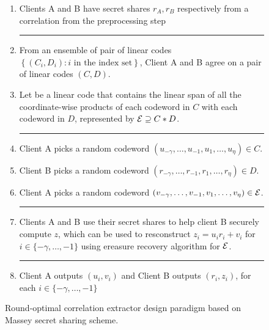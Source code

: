 \begin{figure}[htp]%
\begin{boxedalgo}
\begin{enumerate}[leftmargin=5mm]
	\item Clients A and B have secret shares $r_A, r_B $ respectively from a correlation from the preprocessing step\\
	\hrule
	
	\item From an ensemble of pair of linear codes $\left\{(C_i,D_i)\colon i\text{ in the index set}\right\}$, Client A and B agree on a pair of linear codes $(C,D)$.
	
	\item Let \cE be a linear code that contains the linear span of all the coordinate-wise products of each codeword in $C$ with each codeword in $D$, represented by ${\mathcal E} \supseteq C*D$. \\
	\hrule
	
	\item Client A picks a random codeword $(u_{-\gamma},\dotsc,u_{-1},u_1,\dotsc,u_\eta)\in C$.
	
	\item Client B picks a random codeword $(r_{-\gamma},\dotsc,r_{-1},r_1,\dotsc,r_\eta)\in D$.
	
	\item Client A picks a random codeword $(v_{-\gamma},\dotsc,v_{-1},v_1,\dotsc,v_\eta)\in{\mathcal E}$. \\ 
	\hrule 
	
	\item Clients A and B use their secret shares to help client B securely compute $ z $, which can be used to resconstruct $ z_i = u_i r_i + v_i $ for $ i \in \{-\gamma, \dotsc, -1 \} $ using ereasure recovery algorithm for $ {\mathcal E} $.
	\hrule 
	
	\item Client A outputs $(u_i,v_i)$ and Client B outputs $(r_i,z_i)$, for each $i\in\{-\gamma,\dotsc,-1\}$ 
\end{enumerate}
\end{boxedalgo}
\caption{Round-optimal correlation extractor design paradigm based on Massey secret sharing scheme.}
\label{fig:paradigm}
\end{figure}











